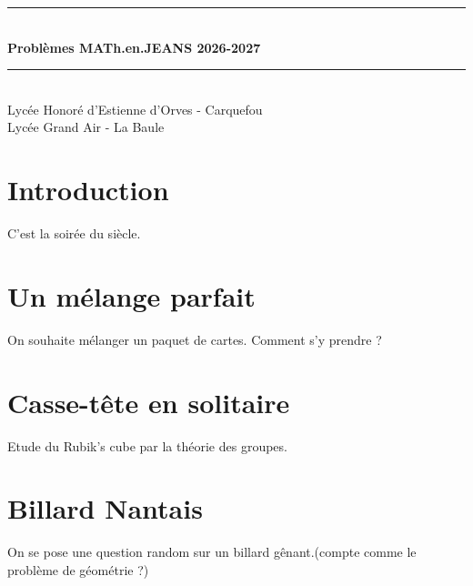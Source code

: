 \documentclass[a4paper,11pt]{article}
\begin{document}
 \begin{titlepage}
\newcommand{\HRule}{\rule{\linewidth}{0.5mm}}
\text{}
\vspace{2cm}
\center

\HRule \\[0.15cm]
{ \huge \bfseries Problèmes MATh.en.JEANS 2026-2027\\[0.15cm] }
\HRule \\[1.5cm]


\vspace{2cm}
Lycée Honoré d'Estienne d'Orves - Carquefou\\
Lycée Grand Air - La Baule
\vspace{5cm}
\section*{Introduction}

C'est la soirée du siècle. 


\end{titlepage}

\newpage

\section{Un mélange parfait}

On souhaite mélanger un paquet de cartes. Comment s'y prendre ?


\newpage

\section{Casse-tête en solitaire }


Etude du Rubik's cube par la théorie des groupes.

\newpage

\section{Billard Nantais}

On se pose une question random sur un billard gênant.(compte comme le problème de géométrie ?)



\newpage
\end{document}
